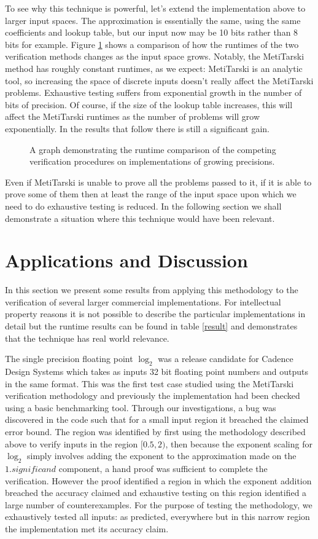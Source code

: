 \documentclass[a4]{article}
\begin{document}
To see why this technique is powerful, let's extend the implementation above to larger input spaces. The approximation is essentially the same, using the same coefficients and lookup table, but our input now may be 10 bits rather than 8 bits for example. Figure \ref{runtime_graph} shows a comparison of how the runtimes of the two verification methods changes as the input space grows. Notably, the MetiTarski method has roughly constant runtimes, as we expect: MetiTarski is an analytic tool, so increasing the space of discrete inputs doesn't really affect the MetiTarski problems. Exhaustive testing suffers from exponential growth in the number of bits of precision. Of course, if the size of the lookup table increases, this will affect the MetiTarski runtimes as the number of problems will grow exponentially. In the results that follow there is still a significant gain.
\begin{figure}
\centering

\caption{A graph demonstrating the runtime comparison of the competing verification procedures on implementations of growing precisions. \label{runtime_graph}
}
\end{figure}
Even if MetiTarski is unable to prove all the problems passed to it, if it is able to prove some of them then at least the range of the input space upon which we need to do exhaustive testing is reduced. In the following section we shall demonstrate a situation where this technique would have been relevant. 

\section{Applications and Discussion}
In this section we present some results from applying this methodology to the verification of several larger commercial implementations. For intellectual property reasons it is not possible to describe the particular implementations in detail but the runtime results can be found in table \ref{result} and demonstrates that the technique has real world relevance. 

The single precision floating point $\log_2$ was a release candidate for Cadence Design Systems which takes as inputs 32 bit floating point numbers and outputs in the same format. This was the first test case studied using the MetiTarski verification methodology and previously the implementation had been checked using a basic benchmarking tool. Through our investigations, a bug was discovered in the code such that for a small input region it breached the claimed error bound. The region was identified by first using the methodology described above to verify inputs in the region $[0.5,2)$, then because the exponent scaling for $\log_2$ simply involves adding the exponent to the approximation made on the $1.\textit{significand}$ component, a hand proof was sufficient to complete the verification. However the proof identified a region in which the exponent addition breached the accuracy claimed and exhaustive testing on this region identified a large number of counterexamples. For the purpose of testing the methodology, we exhaustively tested all inputs: as predicted, everywhere but in this narrow region the implementation met its accuracy claim.
\end{document}
